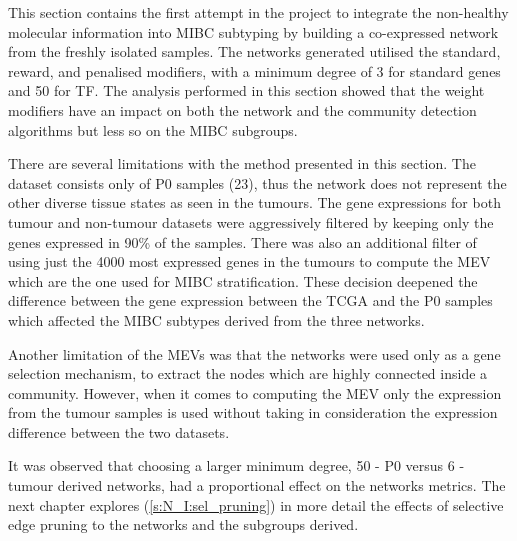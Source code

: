 This section contains the first attempt in the project to integrate the non-healthy molecular information into MIBC subtyping by building a co-expressed network from the freshly isolated samples. The networks generated utilised the standard, reward, and penalised modifiers, with a minimum degree of 3 for standard genes and 50 for TF. The analysis performed in this section showed that the weight modifiers have an impact on both the network and the community detection algorithms but less so on the MIBC subgroups. 

There are several limitations with the method presented in this section. The dataset consists only of P0 samples (23), thus the network does not represent the other diverse tissue states as seen in the tumours. The gene expressions for both tumour and non-tumour datasets were aggressively filtered by keeping only the genes expressed in 90\% of the samples. There was also an additional filter of using just the 4000 most expressed genes in the tumours to compute the MEV which are the one used for MIBC stratification. These decision deepened the difference between the gene expression between the TCGA and the P0 samples which affected the MIBC subtypes derived from the three networks.

Another limitation of the MEVs was that the networks were used only as a gene selection mechanism, to extract the nodes which are highly connected inside a community. However, when it comes to computing the MEV only the expression from the tumour samples is used without taking in consideration the expression difference between the two datasets.

It was observed that choosing a larger minimum degree, 50 - P0 versus 6 - tumour derived networks, had a proportional effect on the networks metrics. The next chapter explores (\cref{s:N_I:sel_pruning}) in more detail the effects of selective edge pruning to the networks and the subgroups derived. 







